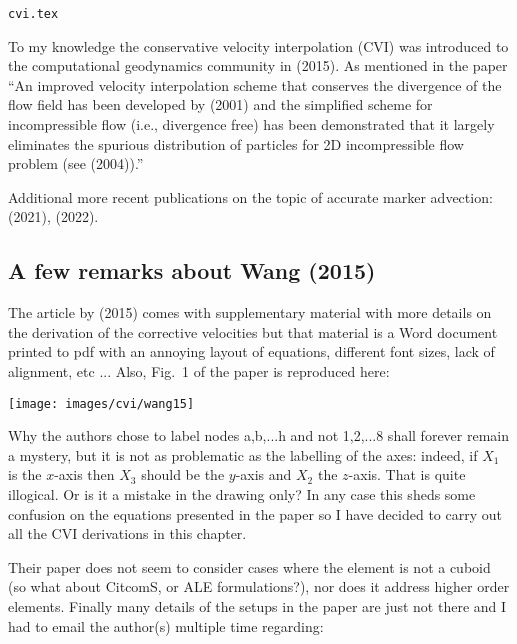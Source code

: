 \begin{flushright} {\tiny {\color{gray} \tt cvi.tex}} \end{flushright}


To my knowledge the conservative velocity interpolation (CVI) was introduced to 
the computational geodynamics community in \textcite{waav15} (2015). 
As mentioned in the paper  ``An improved velocity interpolation scheme that conserves the divergence 
of the flow field has been developed by \textcite{jepm01} (2001) and the simplified scheme for incompressible 
flow (i.e., divergence free) has been demonstrated that it largely eliminates the spurious 
distribution of particles for 2D incompressible flow problem (see \textcite{meje04} (2004)).''

Additional more recent publications on the topic of accurate marker 
advection: \textcite{simw21} (2021), \textcite{siwv22} (2022).

\subsection{A few remarks about Wang \etal (2015)}

The article by \textcite{waav15} (2015) comes with supplementary material with more details 
on the derivation of the corrective velocities but that material is a Word
document printed to pdf with an annoying layout of equations, different font sizes,
lack of alignment, etc ... Also, Fig.~1 of the paper is reproduced here:
\begin{center}
\texttt{[image: images/cvi/wang15]}
\end{center}
Why the authors chose to label nodes a,b,...h and not 1,2,...8 shall forever remain 
a mystery, but it is not as problematic as the labelling of the axes:
indeed, if $X_1$ is the $x$-axis then $X_3$ should be the $y$-axis 
and $X_2$ the $z$-axis. That is quite illogical. Or is it a mistake in 
the drawing only? In any case this sheds some confusion on the equations 
presented in the paper so I have decided to carry out all the CVI derivations 
in this chapter.

Their paper does not seem to consider cases where the element is not a 
cuboid (so what about CitcomS, or ALE formulations?), nor does it address higher order elements. 
Finally many details of the setups in the paper are just not there and I had to 
email the author(s) multiple time regarding:

